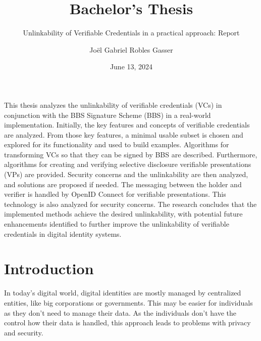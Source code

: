 \documentclass[
	a4paper               %
	,BCOR=0mm            %
	,bibliography=totoc   %
	,listof=totoc         %
	,monolingual
	,twoside=false
]{bfhthesis}              %
\begin{document}
\frontmatter

\title{Bachelor's Thesis}
\subtitle{Unlinkability of Verifiable Credentials in a practical approach: Report}
\author{Joël Gabriel Robles Gasser}
\date{June 13, 2024}

\maketitle

This thesis analyzes the unlinkability of verifiable credentials (VCs) in conjunction with the BBS Signature Scheme (BBS) in a real-world implementation. Initially, the key features and concepts of verifiable credentials are analyzed. From those key features, a minimal usable subset is chosen and explored for its functionality and used to build examples. Algorithms for transforming VCs so that they can be signed by BBS are described. Furthermore, algorithms for creating and verifying selective disclosure verifiable presentations (VPs) are provided. Security concerns and the unlinkability are then analyzed, and solutions are proposed if needed. The messaging between the holder and verifier is handled by OpenID Connect for verifiable presentations. This technology is also analyzed for security concerns. The research concludes that the implemented methods achieve the desired unlinkability, with potential future enhancements identified to further improve the unlinkability of verifiable credentials in digital identity systems.


\tableofcontents

\mainmatter

\chapter{Introduction}
In today's digital world, digital identities are mostly managed by centralized entities, like big corporations or governments. This may be easier for individuals as they don't need to manage their data. As the individuals don't have the control how their data is handled, this approach leads to problems with privacy and security. \\
\end{document}
